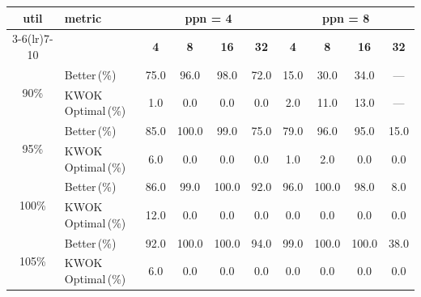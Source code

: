 \begin{tabular}{@{}c l *{8}{c}@{}}
\toprule
\multirow{2}{*}{\textbf{util}} & \multirow{2}{*}{\textbf{metric}} &\multicolumn{4}{c}{\textbf{ppn = 4}} & \multicolumn{4}{c}{\textbf{ppn = 8}}\\
\cmidrule(lr){3-6}\cmidrule(lr){7-10}
 &  & \textbf{4} & \textbf{8} & \textbf{16} & \textbf{32} & \textbf{4} & \textbf{8} & \textbf{16} & \textbf{32}\\
\midrule
\multirow{2}{*}{90\%}
& Better\,(\%) & 75.0 & 96.0 & 98.0 & 72.0 & 15.0 & 30.0 & 34.0 & \multicolumn{1}{c}{—} \\
& KWOK\,Optimal\,(\%) & 1.0 & 0.0 & 0.0 & 0.0 & 2.0 & 11.0 & 13.0 & \multicolumn{1}{c}{—} \\
\midrule
\multirow{2}{*}{95\%}
& Better\,(\%) & 85.0 & 100.0 & 99.0 & 75.0 & 79.0 & 96.0 & 95.0 & 15.0 \\
& KWOK\,Optimal\,(\%) & 6.0 & 0.0 & 0.0 & 0.0 & 1.0 & 2.0 & 0.0 & 0.0 \\
\midrule
\multirow{2}{*}{100\%}
& Better\,(\%) & 86.0 & 99.0 & 100.0 & 92.0 & 96.0 & 100.0 & 98.0 & 8.0 \\
& KWOK\,Optimal\,(\%) & 12.0 & 0.0 & 0.0 & 0.0 & 0.0 & 0.0 & 0.0 & 0.0 \\
\midrule
\multirow{2}{*}{105\%}
& Better\,(\%) & 92.0 & 100.0 & 100.0 & 94.0 & 99.0 & 100.0 & 100.0 & 38.0 \\
& KWOK\,Optimal\,(\%) & 6.0 & 0.0 & 0.0 & 0.0 & 0.0 & 0.0 & 0.0 & 0.0 \\
\bottomrule
\end{tabular}
